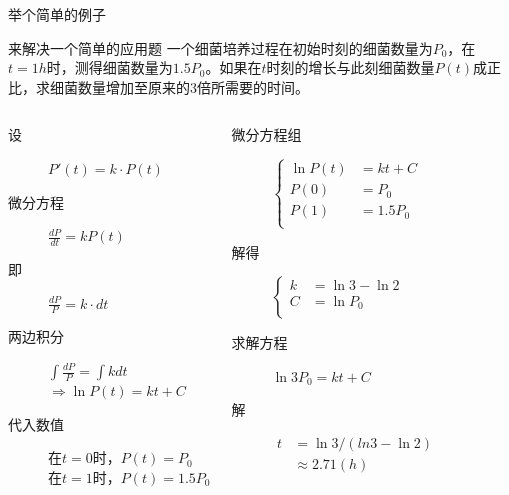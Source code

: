 \documentclass[xcolor={usenames,dvipsnames}]{beamer}
\begin{document}
\begin{frame}{举个简单的例子}
\begin{exampleblock}{来解决一个简单的应用题}
一个细菌培养过程在初始时刻的细菌数量为$P_0$，在$t=1h$时，测得细菌数量为$1.5P_0$。如果在$t$时刻的增长与此刻细菌数量$P(t)$成正比，求细菌数量增加至原来的3倍所需要的时间。
\end{exampleblock}

\begin{columns}
\begin{description}
 \item[设] $P'(t) = k \cdot P(t)$ 
 \item[微分方程] $\frac{{dP}}{{dt}} = kP(t)$
 \item[即]  $\frac{{dP}}{{P}} = k \cdot dt$
 \item[两边积分] $\int {\frac{{dP}}{P} = \int {kdt} } $\\
 $ \Rightarrow \ln P(t) = kt + C$
 \item[代入数值] 在$t=0$时，$P(t)=P_0$\\
 在$t=1$时，$P(t)=1.5P_0$
\end{description}
\begin{description}
	 \item[微分方程组] $
	 \left\{
	 \begin{aligned}
	 \ln P(t) &= kt + C \\
	 P(0)&=P_0 \\
	 P(1)&=1.5P_0 \\
	 \end{aligned}
	 \right.
	 $
	 \item[解得] $
	 \left\{
	 \begin{aligned}
	 k&=\ln 3-\ln 2 \\
	 C&=\ln P_0 \\
	 \end{aligned}
	 \right.
	 $
	 \item[求解方程] $\ln 3P_0 = kt + C$
	 \item[解] $ 
	 \begin{aligned}
	 t&=\ln 3/(ln3 - \ln 2) \\
	  & \approx 2.71 (h)
	 \end{aligned}$
\end{description}
\end{columns}
\end{frame}
\end{document}
